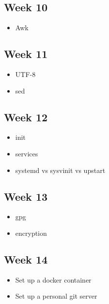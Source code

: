 \documentclass[11pt]{article}
\begin{document}
\subsection*{Week 10}
\begin{itemize}
	\item Awk
\end{itemize}

\subsection*{Week 11}
\begin{itemize}
	\item UTF-8
	\item sed
\end{itemize}

\subsection*{Week 12}
\begin{itemize}
	\item init
	\item services
	\item systemd vs sysvinit vs upstart
\end{itemize}

\subsection*{Week 13}
\begin{itemize}
	\item gpg
	\item encryption
\end{itemize}

\subsection*{Week 14}
\begin{itemize}
	\item Set up a docker container
	\item Set up a personal git server
\end{itemize}
\end{document}
